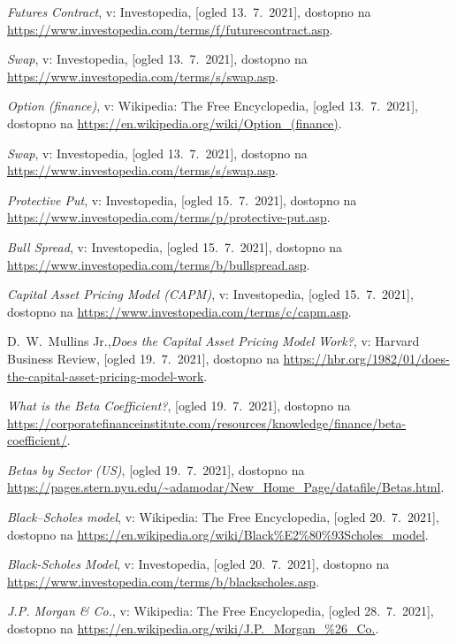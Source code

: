 \documentclass[12pt,a4paper]{amsart}
\theoremstyle{definition} %
\theoremstyle{plain} %
\begin{document}
\begin{thebibliography}{99}
\emph{Futures Contract}, v: Investopedia, [ogled 13.~7.~2021], dostopno na \url{https://www.investopedia.com/terms/f/futurescontract.asp}.

\emph{Swap}, v: Investopedia, [ogled 13.~7.~2021], dostopno na \url{https://www.investopedia.com/terms/s/swap.asp}.

\emph{Option (finance)}, v: Wikipedia: The Free Encyclopedia, [ogled 13.~7.~2021], dostopno na \url{https://en.wikipedia.org/wiki/Option_(finance)}.

\emph{Swap}, v: Investopedia, [ogled 13.~7.~2021], dostopno na \url{https://www.investopedia.com/terms/s/swap.asp}.

\emph{Protective Put}, v: Investopedia, [ogled 15.~7.~2021], dostopno na \url{https://www.investopedia.com/terms/p/protective-put.asp}.

\emph{Bull Spread}, v: Investopedia, [ogled 15.~7.~2021], dostopno na \url{https://www.investopedia.com/terms/b/bullspread.asp}.

\emph{Capital Asset Pricing Model (CAPM)}, v: Investopedia, [ogled 15.~7.~2021], dostopno na \url{https://www.investopedia.com/terms/c/capm.asp}.

D.~W.~Mullins Jr.,\emph{Does the Capital Asset Pricing Model Work?}, v: Harvard Business Review, [ogled 19.~7.~2021], dostopno na \url{https://hbr.org/1982/01/does-the-capital-asset-pricing-model-work}.

\emph{What is the Beta Coefficient?}, [ogled 19.~7.~2021], dostopno na \url{https://corporatefinanceinstitute.com/resources/knowledge/finance/beta-coefficient/}.

\emph{Betas by Sector (US)}, [ogled 19.~7.~2021], dostopno na \url{https://pages.stern.nyu.edu/~adamodar/New_Home_Page/datafile/Betas.html}.

\emph{Black–Scholes model}, v: Wikipedia: The Free Encyclopedia, [ogled 20.~7.~2021], dostopno na \url{https://en.wikipedia.org/wiki/Black\%E2\%80\%93Scholes_model}.

\emph{Black-Scholes Model}, v: Investopedia, [ogled 20.~7.~2021], dostopno na \url{https://www.investopedia.com/terms/b/blackscholes.asp}.

\emph{J.P. Morgan \& Co.}, v: Wikipedia: The Free Encyclopedia, [ogled 28.~7.~2021], dostopno na \url{https://en.wikipedia.org/wiki/J.P._Morgan_\%26_Co.}.


\end{thebibliography}
\end{document}
